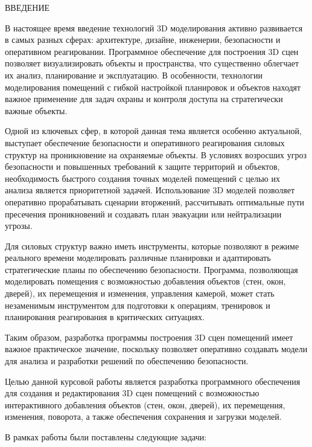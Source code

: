 \begin{center}
    \MakeUppercase{\large Введение}
\end{center}

В настоящее время введение технологий 3D моделирования активно развивается в самых разных сферах: архитектуре, дизайне, инженерии, безопасности и оперативном реагировании. Программное обеспечение для построения 3D сцен позволяет визуализировать объекты и пространства, что существенно облегчает их анализ, планирование и эксплуатацию. В особенности, технологии моделирования помещений с гибкой настройкой планировок и объектов находят важное применение для задач охраны и контроля доступа на стратегически важные объекты.

Одной из ключевых сфер, в которой данная тема является особенно актуальной, выступает обеспечение безопасности и оперативного реагирования силовых структур на проникновение на охраняемые объекты. В условиях возросших угроз безопасности и повышенных требований к защите территорий и объектов, необходимость быстрого создания точных моделей помещений с целью их анализа является приоритетной задачей. Использование 3D моделей позволяет оперативно прорабатывать сценарии вторжений, рассчитывать оптимальные пути пресечения проникновений и создавать план эвакуации или нейтрализации угрозы.

Для силовых структур важно иметь инструменты, которые позволяют в режиме реального времени моделировать различные планировки и адаптировать стратегические планы по обеспечению безопасности. Программа, позволяющая моделировать помещения с возможностью добавления объектов (стен, окон, дверей), их перемещения и изменения, управления камерой, может стать незаменимым инструментом для подготовки к операциям, тренировок и планирования реагирования в критических ситуациях.

Таким образом, разработка программы построения 3D сцен помещений имеет важное практическое значение, поскольку позволяет оперативно создавать модели для анализа и разработки решений по обеспечению безопасности.

Целью данной курсовой работы является разработка программного обеспечения для создания и редактирования 3D сцен помещений с возможностью интерактивного добавления объектов (стен, окон, дверей), их перемещения, изменения, поворота, а также обеспечения сохранения и загрузки моделей.

\vspace{0.25cm}
В рамках работы были поставлены следующие задачи:

